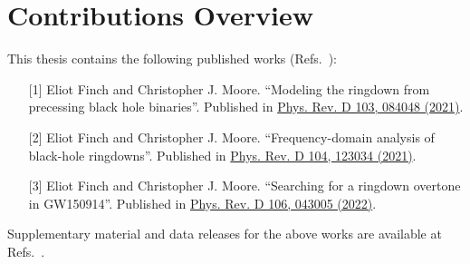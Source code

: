 \documentclass[
12pt, %
english, %
doublespacing, %
headsepline, %
]{MastersDoctoralThesis} %
\begin{document}








\chapter*{Contributions Overview}

This thesis contains the following published works (Refs.~\cite{Finch:2021iip, Finch:2021qph, Finch:2022ynt}):
\begin{itemize}
\item[{[1]}] Eliot Finch and Christopher J. Moore. ``Modeling the ringdown from precessing black hole binaries''. Published in \href{https://journals.aps.org/prd/abstract/10.1103/PhysRevD.103.084048}{Phys. Rev. D 103, 084048 (2021)}.
\item[{[2]}] Eliot Finch and Christopher J. Moore. ``Frequency-domain analysis of black-hole
ringdowns''. Published in \href{https://journals.aps.org/prd/abstract/10.1103/PhysRevD.104.123034}{Phys. Rev. D 104, 123034 (2021)}.
\item[{[3]}] Eliot Finch and Christopher J. Moore. ``Searching for a ringdown overtone in
GW150914''. Published in \href{https://journals.aps.org/prd/abstract/10.1103/PhysRevD.106.043005}{Phys. Rev. D 106, 043005 (2022)}.
\end{itemize}
Supplementary material and data releases for the above works are available at Refs.~\cite{finch_eliot_2021_4538194, finch_eliot_2021_5569759, finch_eliot_2022_6949492}.
\end{document}
